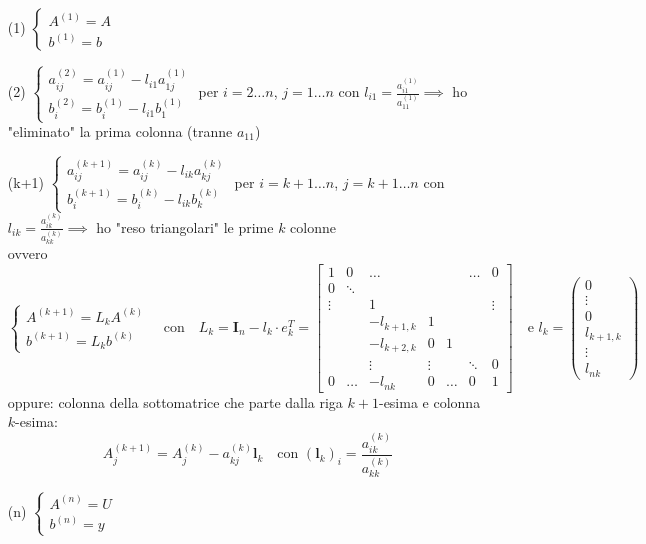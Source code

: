\documentclass[a4paper,10pt]{article}
\theoremstyle{definition}
\newcommand{\bv}{\boldsymbol} %
\theoremstyle{indentdefinition}
\theoremstyle{indenttheorem}
\theoremstyle{myremark}
\theoremstyle{indentgeneral}
\theoremstyle{plain}
\theoremstyle{plain}
\begin{document}
\begin{itemize}
    \item[(1)] $\begin{cases}
                  A^{(1)}=A \\
                    b^{(1)}=b
                \end{cases}$
    \item[(2)] $\begin{cases}
                  a_{ij}^{(2)}= a_{ij}^{(1)}-l_{i1} a_{1j}^{(1)}\\
                    b_i^{(2)}= b_i^{(1)}-l_{i1}b_1^{(1)}
                \end{cases}$ per $i=2\dots n$, $j=1\dots n$ con $l_{i1}=\frac{a_{i1}^{(1)}}{a_{11}^{(1)}}\implies$ ho "eliminato" la prima colonna (tranne $a_{11}$)
    \item[(k+1)] $\begin{cases}
                  a_{ij}^{(k+1)}= a_{ij}^{(k)}-l_{ik} a_{kj}^{(k)}\\
                    b_i^{(k+1)}= b_i^{(k)}-l_{ik}b_k^{(k)}
                \end{cases}$ per $i=k+1\dots n$, $j=k+1\dots n$ con $l_{ik}=\frac{a_{ik}^{(k)}}{a_{kk}^{(k)}}\implies$ ho "reso triangolari" le prime $k$ colonne \\
                ovvero
                $$\begin{cases}
                    A^{(k+1)}=L_kA^{(k)} \\
                    b^{(k+1)}=L_kb^{(k)}
                \end{cases} \quad \text{con}\quad L_k=\boldsymbol{I}_{n}-l_{k}\cdot e_{k}^{T}=\begin{bmatrix}
1 & 0 & \dots &  & & \dots & 0 \\
0 & \ddots &  &  &  & & \\
\vdots &  & 1 &  & & & \vdots \\
 &  & -l_{k+1,k} & 1 &  & & \\
 &  & -l_{k+2,k} & 0 & 1 & &  \\
 &  & \vdots & \vdots &  &\ddots & 0 \\
0 & \dots & -l_{nk} & 0 & \dots & 0 & 1 
\end{bmatrix}\quad \text{e } l_k=\begin{pmatrix} 0 \\ \vdots \\ 0 \\ l_{k+1,k} \\ \vdots \\ l_{nk}
                \end{pmatrix}$$
                oppure: colonna della sottomatrice che parte dalla riga $k+1$-esima e colonna $k$-esima: 
                $$A_j^{(k+1)}=A_j^{(k)}-a_{kj}^{(k)}\bv{l}_k\quad \text{con } (\bv{l}_k)_i=\frac{a_{ik}^{(k)}}{a_{kk}^{(k)}}$$
    \item[(n)]  $\begin{cases}
    A^{(n)}=U \\
    b^{(n)}=y
\end{cases} $
\end{itemize}
\end{document}
